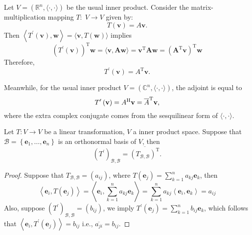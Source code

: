 \begin{example} Let \(V = ({\mathbb{R}}^{n},\langle  \cdot , \cdot  \rangle)\) be the usual inner product. Consider the matrix-multiplication mapping \(T : \;V \rightarrow  V\) given by:
\[
T\left( \mathbf{v}\right)  = A\mathbf{v}.
\]
Then \(\left\langle  {{T}^{\prime }\left( \mathbf{v}\right),\mathbf{w}}\right\rangle   = \langle \mathbf{v},T\left( \mathbf{w}\right) \rangle\) implies
\[
{\left( {T}^{\prime }\left( \mathbf{v}\right) \right) }^{\mathrm{T}}\mathbf{w} = \langle \mathbf{v},\mathbf{A}\mathbf{w}\rangle
= {\mathbf{v}}^{\mathrm{T}}\mathbf{A}\mathbf{w}
= {\left( {\mathbf{A}}^{\mathrm{T}}\mathbf{v}\right) }^{\mathrm{T}}\mathbf{w}
\]
Therefore, 
\[{T}^{\prime }\left( \mathbf{v}\right)  = {A}^{\mathrm{T}}\mathbf{v}.\]

Meanwhile, for the usual inner product \(V = ({\mathbb{C}}^{n},\langle  \cdot , \cdot  \rangle)\), the adjoint is equal to
\[{T}^{\prime }\left( \mathbf{v}\right)  = {A}^{\mathrm{H}}\mathbf{v} = \overline{A}^{\mathrm{T}}{\bf v},\]
where the extra complex conjugate comes from the sesquilinear form of $\langle  \cdot , \cdot  \rangle$.
\end{example}

\begin{proposition} \label{prop:adjoint_matrix} Let \(T : V \rightarrow  V\) be a linear transformation, \(V\) a inner product space. Suppose that \(\mathcal{B} = \left\{  {{\mathbf{e}}_{1},\ldots,{\mathbf{e}}_{n}}\right\}\) is an orthonormal basis of \(V\), then
\[
{\left( {T}^{\prime }\right) }_{\mathcal{B},\mathcal{B}} = \overline{{\left( T_{\mathcal{B},\mathcal{B}}\right) }^{\mathrm{T}}}.
\]
\end{proposition}

\begin{proof} Suppose that \(T_{\mathcal{B},\mathcal{B}} = \left( {a}_{ij}\right)\), where \(T\left( {\mathbf{e}}_{j}\right)  = \mathop{\sum }\limits_{{k = 1}}^{n}{a}_{kj}{\mathbf{e}}_{k}\), then
\[
\left\langle  {{\mathbf{e}}_{i},T\left( {\mathbf{e}}_{j}\right) }\right\rangle   = \left\langle  {{\mathbf{e}}_{i},\mathop{\sum }\limits_{{k = 1}}^{n}{a}_{kj}{\mathbf{e}}_{k}}\right\rangle
= \mathop{\sum }\limits_{{k = 1}}^{n}{a}_{kj}\left\langle  {{\mathbf{e}}_{i},{\mathbf{e}}_{k}}\right\rangle
= {a}_{ij}
\]
Also, suppose \({\left( {T}^{\prime }\right) }_{\mathcal{B},\mathcal{B}} = \left( {b}_{ij}\right)\), we imply \({T}^{\prime }\left( {\mathbf{e}}_{j}\right)  = \mathop{\sum }\limits_{{k = 1}}^{n}{b}_{ij}{\mathbf{e}}_{k}\), which follows that
\(
\left\langle  {{\mathbf{e}}_{i},{T}^{\prime }\left( {\mathbf{e}}_{j}\right) }\right\rangle   = {b}_{ij}
\)
i.e., \(\overline{{a}_{ji}} = {b}_{ij}\).
\end{proof}

